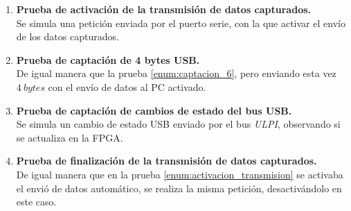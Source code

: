 \begin{enumerate}
    \item \textbf{Prueba de activación de la transmisión de datos capturados.}{\label{enum:activacion_transmision}} \\
    Se simula una petición enviada por el puerto serie, con la que activar el envío de los datos capturados.
    
    \item \textbf{Prueba de captación de 4 bytes USB.} \\
    De igual manera que la prueba \ref{enum:captacion_6}, pero enviando esta vez $4~bytes$ con el envío de datos al PC activado.
    
    \item \textbf{Prueba de captación de cambios de estado del bus USB.} \\
    Se simula un cambio de estado USB enviado por el bus \emph{ULPI}, observando si se actualiza en la FPGA.
    
    \item \textbf{Prueba de finalización de la transmisión de datos capturados.} \\
    De igual manera que en la prueba \ref{enum:activacion_transmision} se activaba el envió de datos automático, se realiza la misma petición, desactivándolo en este caso.
\end{enumerate}





